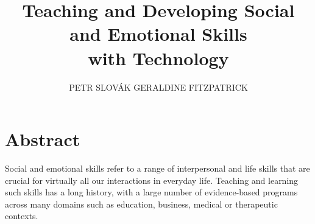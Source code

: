 \documentclass[prodmode,acmtochi]{acmsmall}
\begin{document}



\title{Teaching and Developing Social and Emotional Skills \\ with Technology} 
\author{PETR SLOV\'{A}K %
 GERALDINE FITZPATRICK 
		}
        

\maketitle

\section*{Abstract} 
Social and emotional skills refer to a range of interpersonal and life skills that are crucial for virtually all our interactions in everyday life. Teaching and learning such skills has a long history, with a large number of evidence-based programs across many domains such as education, business, medical or therapeutic contexts. 
\end{document}
